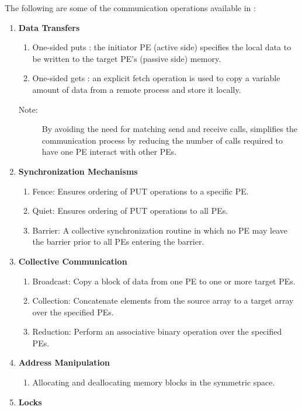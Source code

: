 \medskip{}
The following are some of the communication operations available in
\openshmem:
\begin{enumerate}
\item \textbf{Data Transfers }

\begin{enumerate}
\item One-sided puts : the initiator \ac{PE} (active side) specifies the local
data to be written to the target \ac{PE}'s (passive side) memory. 
\item One-sided gets : an explicit fetch operation is used to copy a variable
amount of data from a remote process and store it locally.\end{enumerate}
\begin{description}
\item [{{Note:}}] By avoiding the need for matching send and receive
calls, \openshmem simplifies the communication process by reducing the
number of calls required to have one \ac{PE} interact with other \ac{PE}s. 
\end{description}
\item \textbf{Synchronization Mechanisms }

\begin{enumerate}
\item Fence: Ensures ordering of PUT operations to a specific \ac{PE}. 
\item Quiet: Ensures ordering of PUT operations to all \ac{PE}s. 
\item Barrier: A collective synchronization routine in which no \ac{PE} may leave
the barrier prior to all \ac{PE}s entering the barrier. 
\end{enumerate}
\item \textbf{Collective Communication}

\begin{enumerate}
\item Broadcast: Copy a block of data from one \ac{PE} to one or more target
PEs. 
\item Collection: Concatenate elements from the source array to a target
array over the specified \ac{PE}s. 
\item Reduction: Perform an associative binary operation over the specified
\ac{PE}s. 
\end{enumerate}
\item \textbf{Address Manipulation}

\begin{enumerate}
\item Allocating and deallocating memory blocks in the symmetric space.
\end{enumerate}
\item \textbf{Locks}


\end{enumerate}

